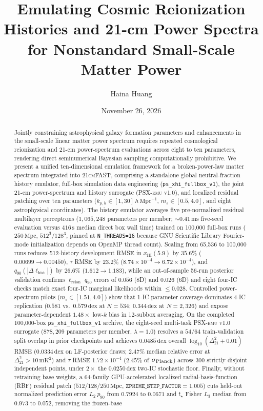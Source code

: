 \documentclass[aps,prd,reprint,superscriptaddress,nofootinbib,amsmath,amssymb,floatfix,longbibliography]{revtex4-2}
\newcommand{\manuscripttitle}{Emulating Cosmic Reionization Histories and 21-cm Power Spectra for Nonstandard Small-Scale Matter Power}
\begin{document}
\title{\manuscripttitle}
\author{Haina Huang}
\date{November 26, 2026}

\begin{abstract}
Jointly constraining astrophysical galaxy formation parameters and enhancements in the small-scale linear matter power spectrum requires repeated cosmological reionization and 21-cm power-spectrum evaluations across eight to ten parameters, rendering direct seminumerical Bayesian sampling computationally prohibitive. We present a unified ten-dimensional emulation framework for a broken-power-law matter spectrum integrated into \textsc{21cmFAST}, comprising a standalone global neutral-fraction history emulator, full-box simulation data engineering (\texttt{ps\_xhi\_fullbox\_v1}), the joint 21-cm power-spectrum and history surrogate (\textsc{PSX-emu v1.0}), and localized residual patching over ten parameters ($k_{p,h} \in [1, 30]\,h\,\mathrm{Mpc}^{-1}$, $m_s \in [0.5, 4.0]$, and eight astrophysical coordinates). The history emulator averages five pre-normalized residual multilayer perceptrons ($1{,}065{,}248$ parameters per member; $\sim 0.41\,\mathrm{ms}$ five-seed evaluation versus $416\,\mathrm{s}$ median direct box wall time) trained on 100,000 full-box runs ($250\,\mathrm{Mpc}$, $512^3/128^3$, pinned at \texttt{N\_THREADS=16} because GNU Scientific Library Fourier-mode initialization depends on OpenMP thread count). Scaling from 65,536 to 100,000 runs reduces 512-history development RMSE in $x_{\mathrm{HI}}(5.9)$ by $35.6\%$ ($0.00699 \to 0.00450$), $\tau$ RMSE by $23.2\%$ ($8.74\times 10^{-4} \to 6.72\times 10^{-4}$), and $q_{90}(|\Delta\ell_{\mathrm{hist}}|)$ by $26.6\%$ ($1.612 \to 1.183$), while an out-of-sample 56-run posterior validation confirms $\ell_{\mathrm{reion}}$ $q_{90}$ errors of $0.056$ (8D) and $0.026$ (6D) and eight four-IC checks match exact four-IC marginal likelihoods within $\le 0.028$. Controlled power-spectrum pilots ($m_s \in [1.51, 4.0]$) show that 1-IC parameter coverage dominates 4-IC replication ($0.581$ vs.\ $0.579\,\mathrm{dex}$ at $N=534$; $0.344\,\mathrm{dex}$ at $N=2{,}326$) and expose parameter-dependent $1.48\times$ low-$k$ bias in 12-subbox averaging. On the completed 100,000-box \texttt{ps\_xhi\_fullbox\_v1} archive, the eight-seed multi-task \textsc{PSX-emu v1.0} surrogate ($878{,}209$ parameters per member, $\lambda=1.0$) resolves a $54/64$ train-validation split overlap in prior checkpoints and achieves $0.0485\,\mathrm{dex}$ overall $\log_{10}(\Delta^2_{21}+0.01)$ RMSE ($0.0334\,\mathrm{dex}$ on LF-posterior draws; $2.47\%$ median relative error at $\Delta^2_{21}>10\,\mathrm{mK}^2$) and $\tau$ RMSE $1.72\times 10^{-4}$ ($2.45\%$ of $\sigma_{\rm Planck}$) across 300 strictly disjoint independent points, under $2\times$ the $0.0250\,\mathrm{dex}$ two-IC stochastic floor. Finally, without retraining base weights, a 64-family GPU-accelerated localized radial-basis-function (RBF) residual patch ($512/128/250\,\mathrm{Mpc}$, $\texttt{ZPRIME\_STEP\_FACTOR}=1.005$) cuts held-out normalized prediction error $L_2\ p_{90}$ from $0.7924$ to $0.0671$ and $t_\star$ Fisher $L_3$ median from $0.973$ to $0.052$, removing the frozen-base 
\end{abstract}
\end{document}
